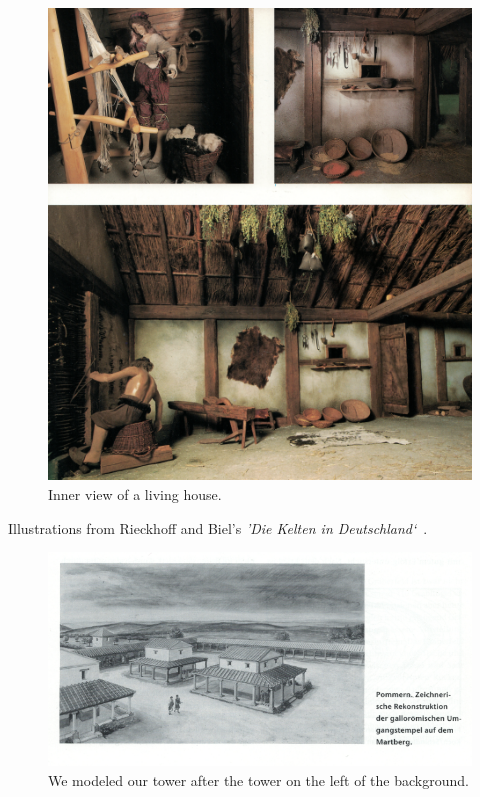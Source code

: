 \begin{figure}[ht]
	\centering
	\includegraphics[width=\linewidth]{pictures/scan_manching_3.png}
	\caption{Inner view of a living house.}
\end{figure}

\clearpage
\pagebreak
Illustrations from Rieckhoff and Biel's \textit{'Die Kelten in Deutschland`}~\cite{rieckhoff-walls1}\cite{rieckhoff-walls2}\cite{rieckhoff-tower}.

\begin{figure}[ht]
	\centering
	\includegraphics[width=\linewidth]{pictures/scan_rieckhoff_tower.png}
	\caption{We modeled our tower after the tower on the left of the background.}
\end{figure}

